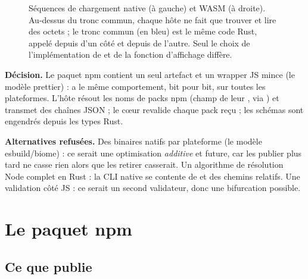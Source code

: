 \begin{figure}[tb]
\caption{Séquences de chargement native (à gauche) et WASM (à droite). Au-dessus du tronc commun, chaque hôte ne fait que trouver et lire des octets ; le tronc commun (en bleu) est le même code Rust, appelé depuis  d'un côté et depuis  de l'autre. Seul le choix de l'implémentation de  et de la fonction d'affichage diffère.}
\label{fig:distribution-sequences}
\end{figure}

\begin{decision}
\textbf{Décision.} Le paquet npm contient un seul artefact  et un wrapper JS mince (\og le modèle prettier\fg{}) :  a le même comportement, bit pour bit, sur toutes les plateformes. L'hôte résout les noms de packs npm (champ  de leur , via ) et transmet des chaînes JSON ; le cœur revalide chaque pack reçu ; les schémas sont engendrés depuis les types Rust.

\textbf{Alternatives refusées.} Des binaires natifs par plateforme (le modèle esbuild/biome) : ce serait une optimisation \emph{additive} et future, car les publier plus tard ne casse rien alors que les retirer casserait. Un algorithme de résolution Node complet en Rust : la CLI native se contente de  et des chemins relatifs. Une validation côté JS : ce serait un second validateur, donc une bifurcation possible.
\end{decision}

\section{Le paquet npm}
\label{sec:distribution-npm}

\subsection{Ce que publie }

